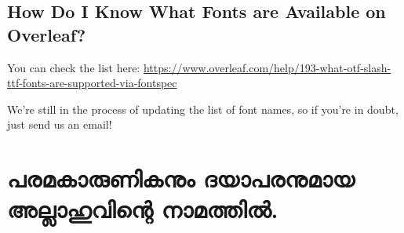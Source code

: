 \documentclass{report}
\begin{document}
\section{How Do I Know What Fonts are Available on Overleaf?}

You can check the list here: \url{https://www.overleaf.com/help/193-what-otf-slash-ttf-fonts-are-supported-via-fontspec}

We're still in the process of updating the list of font names, so if you're in doubt, just send us an email!
\chapter{\textmalayalam{പരമകാരുണികനും ദയാപരനുമായ അല്ലാഹുവിന്റെ നാമത്തില്‍.}}
\end{document}
